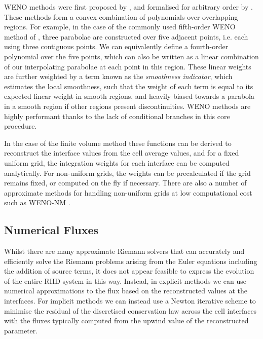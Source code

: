 WENO methods were first proposed by \citet{Liu1994}, and formalised for arbitrary order by \citet{Jiang1996}.
These methods form a convex combination of polynomials over overlapping regions.
For example, in the case of the commonly used fifth-order WENO method of \citet{Jiang1996}, three parabolae are constructed over five adjacent points, i.e. each using three contiguous points.
We can equivalently define a fourth-order polynomial over the five points, which can also be written as a linear combination of our interpolating parabolae at each point in this region.
These linear weights are further weighted by a term known as the \emph{smoothness indicator}, which estimates the local smoothness, such that the weight of each term is equal to its expected linear weight in smooth regions, and heavily biased towards a parabola in a smooth region if other regions present discontinuities.
WENO methods are highly performant thanks to the lack of conditional branches in this core procedure.

In the case of the finite volume method these functions can be derived to reconstruct the interface values from the cell average values, and for a fixed uniform grid, the integration weights for each interface can be computed analytically.
For non-uniform grids, the weights can be precalculated if the grid remains fixed, or computed on the fly if necessary.
There are also a number of approximate methods for handling non-uniform grids at low computational cost such as WENO-NM \citep{Huang2018}.

\subsection{Numerical Fluxes}

Whilst there are many approximate Riemann solvers that can accurately and efficiently solve the Riemann problems arising from the Euler equations including the addition of source terms, it does not appear feasible to express the evolution of the entire RHD system in this way.
Instead, in explicit methods we can use numerical approximations to the flux based on the reconstructed values at the interfaces.
For implicit methods we can instead use a Newton iterative scheme to minimise the residual of the discretised conservation law across the cell interfaces with the fluxes typically computed from the upwind value of the reconstructed parameter.

